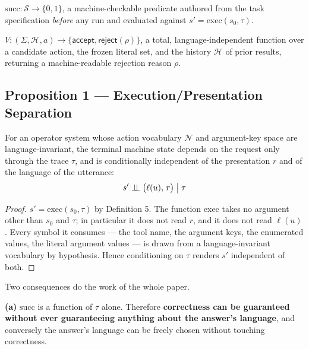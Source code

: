 \begin{definition}
$\mathrm{succ}: \mathcal{S} \to \{0,1\}$, a machine-checkable predicate authored from the task specification \emph{before} any run and evaluated against $s' = \mathrm{exec}(s_0, \tau)$.
\end{definition}

\begin{definition}[Verifier]
$V: (\Sigma, \mathcal{H}, a) \to \{\textsf{accept}, \textsf{reject}(\rho)\}$, a total, language-independent function over a candidate action, the frozen literal set, and the history $\mathcal{H}$ of prior results, returning a machine-readable rejection reason $\rho$.
\end{definition}

\subsection{Proposition 1 --- Execution/Presentation Separation}
\label{sec:execution-presentation-separation}

\begin{proposition}
\label{prop:separation}
For an operator system whose action vocabulary $\mathcal{N}$ and argument-key space are language-invariant, the terminal machine state depends on the request only through the trace $\tau$, and is conditionally independent of the presentation $r$ and of the language of the utterance:
\[
  s' \perp\!\!\!\perp \big(\ell(u),\, r\big) \;\big|\; \tau
\]
\end{proposition}

\begin{proof}
$s' = \mathrm{exec}(s_0, \tau)$ by Definition 5. The function $\mathrm{exec}$ takes no argument other than $s_0$ and $\tau$; in particular it does not read $r$, and it does not read $\ell(u)$. Every symbol it consumes --- the tool name, the argument keys, the enumerated values, the literal argument values --- is drawn from a language-invariant vocabulary by hypothesis. Hence conditioning on $\tau$ renders $s'$ independent of both.
\end{proof}

Two consequences do the work of the whole paper.

\textbf{(a)} $\mathrm{succ}$ is a function of $\tau$ alone. Therefore \textbf{correctness can be guaranteed without ever guaranteeing anything about the answer's language}, and conversely the answer's language can be freely chosen without touching correctness.

